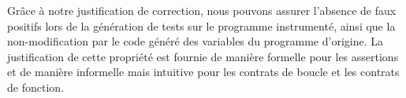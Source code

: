 Grâce à notre justification de correction, nous pouvons assurer l'absence de
faux positifs lors de la génération de tests sur le programme instrumenté, ainsi
que la non-modification par le code généré des variables du programme d'origine.
La justification de cette propriété est fournie de manière formelle pour les
assertions et de manière informelle mais intuitive pour les contrats de boucle
et les contrats de fonction.

